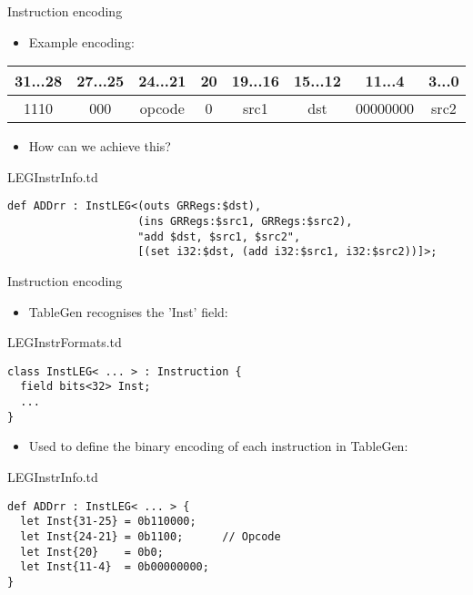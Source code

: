 \begin{frame}[fragile]{Instruction encoding}

\begin{itemize}
    \item Example encoding:
\end{itemize}

\begin{tabular}{|c|c|c|c|c|c|c|c|}
\hline 
31...28 & 27...25 & 24...21 & 20 & 19...16 & 15...12 & 11...4 & 3...0\tabularnewline
\hline 
1110 & 000 & opcode & 0 & src1 & dst & 00000000 & src2\tabularnewline
\hline 
\end{tabular}

\begin{itemize}
    \item How can we achieve this?
\end{itemize}

\begin{block}{LEGInstrInfo.td}
\begin{lstlisting}
def ADDrr : InstLEG<(outs GRRegs:$dst),
                    (ins GRRegs:$src1, GRRegs:$src2),
                    "add $dst, $src1, $src2",
                    [(set i32:$dst, (add i32:$src1, i32:$src2))]>;
\end{lstlisting}
\end{block}

\end{frame}


\begin{frame}[fragile]{Instruction encoding}

\begin{itemize}
    \item TableGen recognises the 'Inst' field:
\end{itemize}

\begin{block}{LEGInstrFormats.td}
\begin{lstlisting}
class InstLEG< ... > : Instruction {
  field bits<32> Inst;
  ...
}
\end{lstlisting}
\end{block}

\begin{itemize}
    \item Used to define the binary encoding of each instruction in TableGen:
\end{itemize}

\begin{block}{LEGInstrInfo.td}
\begin{lstlisting}
def ADDrr : InstLEG< ... > {
  let Inst{31-25} = 0b110000;
  let Inst{24-21} = 0b1100;      // Opcode
  let Inst{20}    = 0b0;
  let Inst{11-4}  = 0b00000000;
}
\end{lstlisting}
\end{block}

\end{frame}

